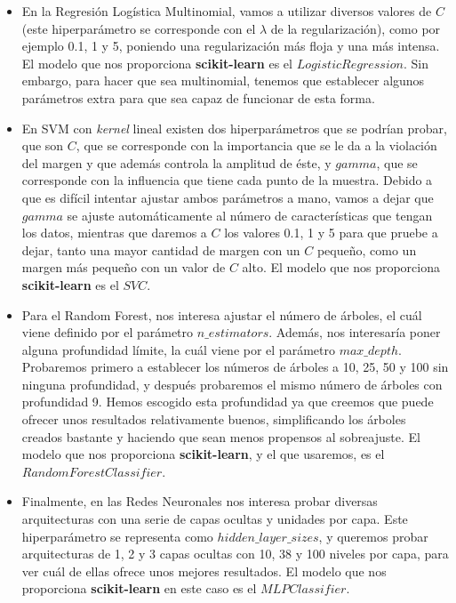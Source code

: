 \documentclass[11pt,a4paper]{article}
\begin{document}
\begin{itemize}[label=\textbullet]
    \item En la Regresión Logística Multinomial, vamos a utilizar diversos valores de $C$ (este hiperparámetro se corresponde con el $\lambda$ de
    la regularización), como por ejemplo 0.1, 1 y 5, poniendo una regularización más floja y una más intensa. El modelo que nos proporciona
    \textbf{scikit-learn} es el $LogisticRegression$. Sin embargo, para hacer que sea multinomial, tenemos que establecer algunos parámetros
    extra para que sea capaz de funcionar de esta forma.
    \item En SVM con \textit{kernel} lineal existen dos hiperparámetros que se podrían probar, que son $C$, que se corresponde con la importancia
    que se le da a la violación del margen y que además controla la amplitud de éste, y $gamma$, que se corresponde con la influencia que tiene cada
    punto de la muestra. Debido a que es difícil intentar ajustar ambos parámetros a mano, vamos a dejar que $gamma$ se ajuste automáticamente al
    número de características que tengan los datos, mientras que daremos a $C$ los valores 0.1, 1 y 5 para que pruebe a dejar, tanto una mayor
    cantidad de margen con un $C$ pequeño, como un margen más pequeño con un valor de $C$ alto. El modelo que nos proporciona \textbf{scikit-learn}
    es el $SVC$.
    \item Para el Random Forest, nos interesa ajustar el número de árboles, el cuál viene definido por el parámetro $n\_estimators$. Además,
    nos interesaría poner alguna profundidad límite, la cuál viene por el parámetro $max\_depth$. Probaremos primero a establecer los números
    de árboles a 10, 25, 50 y 100 sin ninguna profundidad, y después probaremos el mismo número de árboles con profundidad 9. Hemos escogido
    esta profundidad ya que creemos que puede ofrecer unos resultados relativamente buenos, simplificando los árboles creados bastante y haciendo
    que sean menos propensos al sobreajuste. El modelo que nos proporciona \textbf{scikit-learn}, y el que usaremos, es el $RandomForestClassifier$.
    \item Finalmente, en las Redes Neuronales nos interesa probar diversas arquitecturas con una serie de capas ocultas y unidades por capa.
    Este hiperparámetro se representa como $hidden\_layer\_sizes$, y queremos probar arquitecturas de 1, 2 y 3 capas ocultas con 10, 38 y
    100 niveles por capa, para ver cuál de ellas ofrece unos mejores resultados. El modelo que nos proporciona \textbf{scikit-learn} en este
    caso es el $MLPClassifier$.
\end{itemize}
\end{document}

